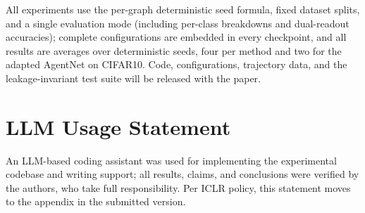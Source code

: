 \documentclass{article}
\begin{document}
All experiments use the per-graph deterministic seed formula, fixed dataset splits, and a single evaluation mode (including per-class breakdowns and dual-readout accuracies); complete configurations are embedded in every checkpoint, and all results are averages over deterministic seeds, four per method and two for the adapted AgentNet on CIFAR10. Code, configurations, trajectory data, and the leakage-invariant test suite will be released with the paper.

\section*{LLM Usage Statement}

An LLM-based coding assistant was used for implementing the experimental codebase and writing support; all results, claims, and conclusions were verified by the authors, who take full responsibility. Per ICLR policy, this statement moves to the appendix in the submitted version.
\end{document}
